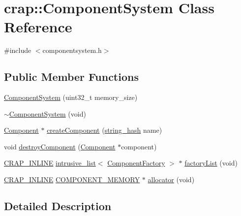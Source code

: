 \hypertarget{classcrap_1_1_component_system}{}\section{crap\+:\+:Component\+System Class Reference}
\label{classcrap_1_1_component_system}


{\ttfamily \#include $<$componentsystem.\+h$>$}

\subsection*{Public Member Functions}
\begin{DoxyCompactItemize}
\item 
\hyperlink{classcrap_1_1_component_system_a9f5375dbdcadc882f9e0a350cf60eaca}{Component\+System} (uint32\+\_\+t memory\+\_\+size)
\item 
\hyperlink{classcrap_1_1_component_system_a99babf981d46a846ed1ae42b59a96113}{$\sim$\+Component\+System} (void)
\item 
\hyperlink{classcrap_1_1_component}{Component} $\ast$ \hyperlink{classcrap_1_1_component_system_ad8fba4ba6a8e2b17b60df7af4e0188eb}{create\+Component} (\hyperlink{classcrap_1_1string__hash}{string\+\_\+hash} name)
\item 
void \hyperlink{classcrap_1_1_component_system_a4a136955ec8d1e780c8e635b4d6fb638}{destroy\+Component} (\hyperlink{classcrap_1_1_component}{Component} $\ast$component)
\item 
\hyperlink{config__x86_8h_a5a40526b8d842e7ff731509998bb0f1c}{C\+R\+A\+P\+\_\+\+I\+N\+L\+I\+N\+E} \hyperlink{classcrap_1_1intrusive__list}{intrusive\+\_\+list}$<$ \hyperlink{classcrap_1_1_component_factory}{Component\+Factory} $>$ $\ast$ \hyperlink{classcrap_1_1_component_system_ac9e3b94d0b2e8dbacdf3ed513c6d39cc}{factory\+List} (void)
\item 
\hyperlink{config__x86_8h_a5a40526b8d842e7ff731509998bb0f1c}{C\+R\+A\+P\+\_\+\+I\+N\+L\+I\+N\+E} \hyperlink{componentsystem_8h_af52a1646c306aa465b339d57fae55d6d}{C\+O\+M\+P\+O\+N\+E\+N\+T\+\_\+\+M\+E\+M\+O\+R\+Y} $\ast$ \hyperlink{classcrap_1_1_component_system_af88ed0eb8039401750054e42566ab855}{allocator} (void)
\end{DoxyCompactItemize}


\subsection{Detailed Description}


